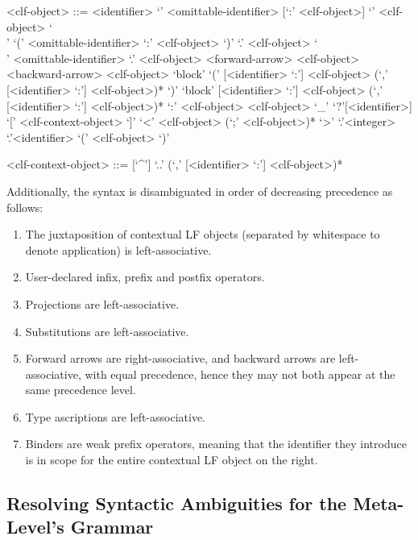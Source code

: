 \begin{grammar}
<clf-object> ::= <identifier>
\alt `{' <omittable-identifier> [`:' <clf-object>] `}' <clf-object>
\alt `\\' `(' <omittable-identifier> `:' <clf-object> `)' `.' <clf-object>
\alt `\\' <omittable-identifier> `.' <clf-object>
 <forward-arrow> <clf-object>
 <backward-arrow> <clf-object>
\alt `block' `(' [<identifier> `:'] <clf-object> (`,' [<identifier> `:'] <clf-object>)* `)'
\alt `block' [<identifier> `:'] <clf-object> (`,' [<identifier> `:'] <clf-object>)*
 `:' <clf-object>
 <clf-object>
\alt `_'
\alt `?'[<identifier>]
 `[' <clf-context-object> `]'
\alt `<' <clf-object> (`;' <clf-object>)* `>'
`.'<integer>
`.'<identifier>
\alt `(' <clf-object> `)'

<clf-context-object> ::= [`^']
\alt `..'
 (`,' [<identifier> `:'] <clf-object>)*
\end{grammar}

Additionally, the syntax is disambiguated in order of decreasing precedence as follows:

\begin{enumerate}
\item The juxtaposition of contextual \ac{LF} objects (separated by whitespace to denote application) is left-associative.
\item User-declared infix, prefix and postfix operators.
\item Projections are left-associative.
\item Substitutions are left-associative.
\item Forward arrows are right-associative, and backward arrows are left-associative, with equal precedence, hence they may not both appear at the same precedence level.
\item Type ascriptions are left-associative.
\item Binders are weak prefix operators, meaning that the identifier they introduce is in scope for the entire contextual \ac{LF} object on the right.
\end{enumerate}

\subsection{Resolving Syntactic Ambiguities for the Meta-Level's Grammar}

